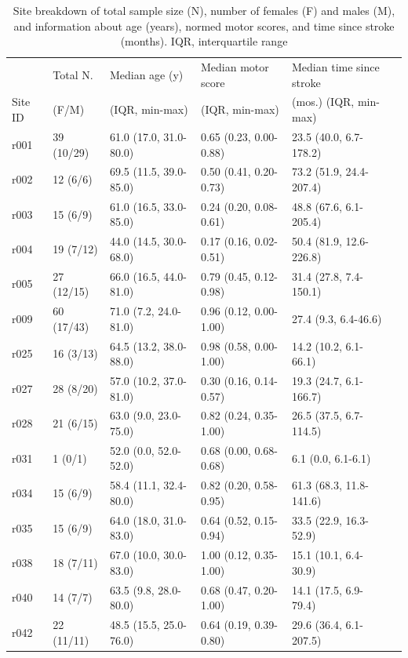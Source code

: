 \documentclass[10pt]{article}
\begin{document}
\begin{table}[h]
\centering
\caption{Site breakdown of total sample size (N), number of females (F) and males (M), and information about age (years), normed motor scores, and time since stroke (months). IQR, interquartile range}
\label{table:5}
\begin{tabular}{llllll}
\toprule
 & Total N. & Median age (y) & Median motor score & Median time since stroke  \\
Site ID & (F/M) & (IQR, min-max) & (IQR, min-max) &   (mos.) (IQR, min-max) \\
\midrule
r001 & 39 (10/29) & 61.0 (17.0, 31.0-80.0) & 0.65 (0.23, 0.00-0.88) & 23.5 (40.0, 6.7-178.2) \\
r002 & 12 (6/6) & 69.5 (11.5, 39.0-85.0) & 0.50 (0.41, 0.20-0.73) & 73.2 (51.9, 24.4-207.4) \\
r003 & 15 (6/9) & 61.0 (16.5, 33.0-85.0) & 0.24 (0.20, 0.08-0.61) & 48.8 (67.6, 6.1-205.4) \\
r004 & 19 (7/12) & 44.0 (14.5, 30.0-68.0) & 0.17 (0.16, 0.02-0.51) & 50.4 (81.9, 12.6-226.8) \\
r005 & 27 (12/15) & 66.0 (16.5, 44.0-81.0) & 0.79 (0.45, 0.12-0.98) & 31.4 (27.8, 7.4-150.1) \\
r009 & 60 (17/43) & 71.0 (7.2, 24.0-81.0) & 0.96 (0.12, 0.00-1.00) & 27.4 (9.3, 6.4-46.6) \\
r025 & 16 (3/13) & 64.5 (13.2, 38.0-88.0) & 0.98 (0.58, 0.00-1.00) & 14.2 (10.2, 6.1-66.1) \\
r027 & 28 (8/20) & 57.0 (10.2, 37.0-81.0) & 0.30 (0.16, 0.14-0.57) & 19.3 (24.7, 6.1-166.7) \\
r028 & 21 (6/15) & 63.0 (9.0, 23.0-75.0) & 0.82 (0.24, 0.35-1.00) & 26.5 (37.5, 6.7-114.5) \\
r031 & 1 (0/1) & 52.0 (0.0, 52.0-52.0) & 0.68 (0.00, 0.68-0.68) & 6.1 (0.0, 6.1-6.1) \\
r034 & 15 (6/9) & 58.4 (11.1, 32.4-80.0) & 0.82 (0.20, 0.58-0.95) & 61.3 (68.3, 11.8-141.6) \\
r035 & 15 (6/9) & 64.0 (18.0, 31.0-83.0) & 0.64 (0.52, 0.15-0.94) & 33.5 (22.9, 16.3-52.9) \\
r038 & 18 (7/11) & 67.0 (10.0, 30.0-83.0) & 1.00 (0.12, 0.35-1.00) & 15.1 (10.1, 6.4-30.9) \\
r040 & 14 (7/7) & 63.5 (9.8, 28.0-80.0) & 0.68 (0.47, 0.20-1.00) & 14.1 (17.5, 6.9-79.4) \\
r042 & 22 (11/11) & 48.5 (15.5, 25.0-76.0) & 0.64 (0.19, 0.39-0.80) & 29.6 (36.4, 6.1-207.5) \\

\end{tabular}
\end{table}
\end{document}
